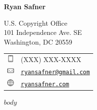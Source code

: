 \documentclass[11pt]{article}
\def\name{Ryan Safner}
\def\footerlink{http://ryansafner.com/cv.pdf}
\begin{document}
{\Huge \rmfamily \textbf{\name}}


\vspace{0.25in}

\begin{minipage}{0.45\linewidth}
  U.S. Copyright Office\\
  101 Independence Ave. SE\\
  Washington, DC 20559\\
\end{minipage}
\begin{minipage}{0.45\linewidth}
  \begin{tabular}{ll}
    \includegraphics[height=1em]{cell} & (XXX) XXX-XXXX \\
    \includegraphics[height=1em]{mail}& \href{mailto:ryansafner@gmail.com}{\tt ryansafner@gmail.com} \\
    \includegraphics[height=1em]{web} & \href{http://ryansafner.com}{\tt ryansafner.com} \\
  \end{tabular}
\end{minipage}

$body$

\end{document}

